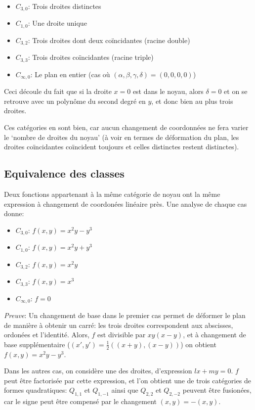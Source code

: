 \documentclass{article}
\begin{document}
\begin{itemize}
\item  $C_{3,0}$: Trois droites distinctes
\item  $C_{1,0}$: Une droite unique
\item  $C_{3,2}$: Trois droites dont deux coïncidantes (racine double)
\item  $C_{3,3}$: Trois droites coïncidantes (racine triple)
\item  $C_{\infty,0}$: Le plan en entier (cas où $(\alpha,\beta,\gamma,\delta)=(0,0,0,0)$)

\end{itemize}

Ceci découle du fait que si la droite $x=0$ est dans le noyau, alors $\delta=0$ et on se retrouve avec un polynôme du second degré en $y$, et donc bien au plus trois droites.

Ces catégories en sont bien, car aucun changement de coordonnées ne fera varier le `nombre de droites du noyau' (à voir en termes de déformation du plan, les droites coïncidantes coïncident toujours et celles distinctes restent distinctes).

\subsection{Equivalence des classes}

Deux fonctions appartenant à la même catégorie de noyau ont la même expression à changement de coordonées linéaire près. Une analyse de chaque cas donne:


\begin{itemize}
\item  $C_{3,0}$: $f(x,y)=x^2y-y^3$
\item  $C_{1,0}$: $f(x,y)=x^2y+y^3$
\item  $C_{3,2}$: $f(x,y)=x^2y$
\item  $C_{3,3}$: $f(x,y)=x^3$
\item  $C_{\infty,0}$: $f=0$

\end{itemize}

\textit{Preuve}: Un changement de base dans le premier cas permet de déformer le plan de manière à obtenir un carré: les trois droites correspondent aux abscisses, ordonées et l'identité. Alors, $f$ est divisible par $xy(x-y)$, et à changement de base supplémentaire ($(x',y')=\frac{1}{2}((x+y),(x-y))$) on obtient $f(x,y)=x^2y-y^3$.

Dans les autres cas, on considère une des droites, d'expression $lx+my=0$. $f$ peut être factorisée par cette expression, et l'on obtient une de trois catégories de formes quadratiques: $Q_{1,1}$ et $Q_{1,-1}$ ainsi que $Q_{2,2}$ et $Q_{2,-2}$ peuvent être fusionées, car le signe peut être compensé par le changement $(x,y)=-(x,y)$.
\end{document}
